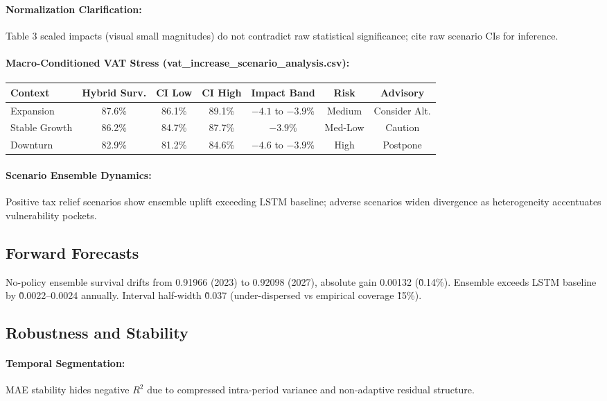 \paragraph{Normalization Clarification:} Table 3 scaled impacts (visual small magnitudes) do not contradict raw statistical significance; cite raw scenario CIs for inference.

\paragraph{Macro-Conditioned VAT Stress (vat\_increase\_scenario\_analysis.csv):}
\begin{center}
\begin{tabular}{lcccccc}
\toprule
Context & Hybrid Surv. & CI Low & CI High & Impact Band & Risk & Advisory \\
\midrule
Expansion & 87.6\% & 86.1\% & 89.1\% & $-4.1$ to $-3.9$\% & Medium & Consider Alt. \\
Stable Growth & 86.2\% & 84.7\% & 87.7\% & $-3.9$\% & Med-Low & Caution \\
Downturn & 82.9\% & 81.2\% & 84.6\% & $-4.6$ to $-3.9$\% & High & Postpone \\
\bottomrule
\end{tabular}
\end{center}

\paragraph{Scenario Ensemble Dynamics:} Positive tax relief scenarios show ensemble uplift exceeding LSTM baseline; adverse scenarios widen divergence as heterogeneity accentuates vulnerability pockets.

\subsection{Forward Forecasts}
No-policy ensemble survival drifts from 0.91966 (2023) to 0.92098 (2027), absolute gain 0.00132 (\~0.14\%). Ensemble exceeds LSTM baseline by \~0.0022--0.0024 annually. Interval half-width \~0.037 (under-dispersed vs empirical coverage \~15\%).

\subsection{Robustness and Stability}
\paragraph{Temporal Segmentation:} MAE stability hides negative $R^2$ due to compressed intra-period variance and non-adaptive residual structure.
